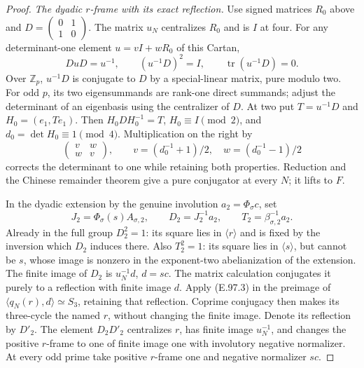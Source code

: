 \begin{proof}
\emph{The dyadic \(r\)-frame with its exact reflection.}
Use signed matrices \(R_0\) above and
\(D=\left(\begin{smallmatrix}0&1\\1&0\end{smallmatrix}\right)\).
The matrix \(u_N\) centralizes \(R_0\) and is \(I\) at four.
For any determinant-one element \(u=vI+wR_0\) of this Cartan,
\[
 DuD=u^{-1},\qquad (u^{-1}D)^2=I,\qquad
                  \operatorname{tr}(u^{-1}D)=0.
                                                        \tag{E.97.4}
\]
Over \(\mathbb Z_p\), \(u^{-1}D\) is conjugate to \(D\) by
a special-linear matrix, pure modulo two.
For odd \(p\), its two eigensummands are rank-one direct
summands; adjust the determinant of an eigenbasis using the
centralizer of \(D\).
At two put \(T=u^{-1}D\) and \(H_0=(e_1,Te_1)\).
Then \(H_0DH_0^{-1}=T\), \(H_0\equiv I\pmod2\), and
\(d_0=\det H_0\equiv1\pmod4\).
Multiplication on the right by
\[
 \begin{pmatrix}v&w\\w&v\end{pmatrix},\qquad
 v=(d_0^{-1}+1)/2,\quad w=(d_0^{-1}-1)/2
                                                        \tag{E.97.5}
\]
corrects the determinant to one while retaining both properties.
Reduction and the Chinese remainder theorem give a pure
conjugator at every \(N\); it lifts to \(F\).

In the dyadic extension by the genuine involution
\(a_2=\Phi_\sigma c\), set
\[
 J_2=\Phi_\sigma(s)A_{\sigma,2},\qquad
 D_2=J_2^{-1}a_2,\qquad T_2=\beta_{\sigma,2}^{-1}a_2.
                                                        \tag{E.97.6}
\]
Already in the full group \(D_2^2=1\): its square lies in
\(\langle r\rangle\) and is fixed by the inversion which
\(D_2\) induces there.  Also \(T_2^2=1\): its square lies
in \(\langle s\rangle\), but cannot be \(s\), whose image is
nonzero in the exponent-two abelianization of the extension.
The finite image of \(D_2\) is \(u_N^{-1}d\), \(d=sc\).
The matrix calculation conjugates it purely to a reflection
with finite image \(d\).  Apply (E.97.3) in the preimage of
\(\langle q_N(r),d\rangle\simeq S_3\), retaining that reflection.
Coprime conjugacy then makes its three-cycle the named \(r\),
without changing the finite image.  Denote its reflection by
\(D'_2\).  The element \(D_2D'_2\) centralizes \(r\), has
finite image \(u_N^{-1}\), and changes the positive \(r\)-frame
to one of finite image one with involutory negative normalizer.
At every odd prime take positive \(r\)-frame one and negative
normalizer \(sc\).


\end{proof}
